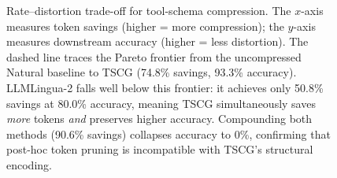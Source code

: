 \begin{figure}[t]
\caption{Rate--distortion trade-off for tool-schema compression. The $x$-axis measures token savings (higher = more compression); the $y$-axis measures downstream accuracy (higher = less distortion). The dashed line traces the Pareto frontier from the uncompressed Natural baseline to TSCG (74.8\% savings, 93.3\% accuracy). LLMLingua-2 falls well below this frontier: it achieves only 50.8\% savings at 80.0\% accuracy, meaning TSCG simultaneously saves \emph{more} tokens \emph{and} preserves higher accuracy. Compounding both methods (90.6\% savings) collapses accuracy to 0\%, confirming that post-hoc token pruning is incompatible with TSCG's structural encoding.}
\label{fig:rate-distortion}
\end{figure}
